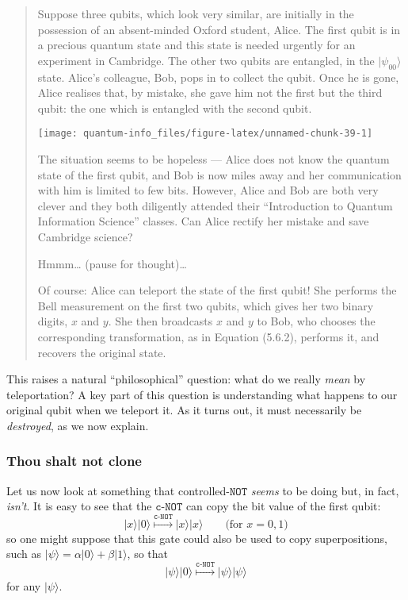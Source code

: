 \documentclass[fleqn]{article}
\begin{document}
\begin{quote}
Suppose three qubits, which look very similar, are initially in the possession of an absent-minded Oxford student, Alice.
The first qubit is in a precious quantum state and this state is needed urgently for an experiment in Cambridge.
The other two qubits are entangled, in the \(|\psi_{00}\rangle\) state. Alice's colleague, Bob, pops in to collect the qubit.
Once he is gone, Alice realises that, by mistake, she gave him not the first but the third qubit: the one which is entangled with the second qubit.

\begin{center}\texttt{[image: quantum-info\_files/figure-latex/unnamed-chunk-39-1]} \end{center}

The situation seems to be hopeless --- Alice does not know the quantum state of the first qubit, and Bob is now miles away and her communication with him is limited to few bits.
However, Alice and Bob are both very clever and they both diligently attended their ``Introduction to Quantum Information Science'' classes.
Can Alice rectify her mistake and save Cambridge science?

Hmmm\ldots{} (pause for thought)\ldots{}

Of course: Alice can teleport the state of the first qubit!
She performs the Bell measurement on the first two qubits, which gives her two binary digits, \(x\) and \(y\).
She then broadcasts \(x\) and \(y\) to Bob, who chooses the corresponding transformation, as in Equation (5.6.2), performs it, and recovers the original state.
\end{quote}

This raises a natural ``philosophical'' question: what do we really \emph{mean} by teleportation?
A key part of this question is understanding what happens to our original qubit when we teleport it.
As it turns out, it must necessarily be \emph{destroyed}, as we now explain.

\hypertarget{thou-shalt-not-clone}{%
\subsubsection{Thou shalt not clone}\label{thou-shalt-not-clone}}

Let us now look at something that controlled-\(\texttt{NOT}\) \emph{seems} to be doing but, in fact, \emph{isn't}.
It is easy to see that the \(\texttt{c-NOT}\) can copy the bit value of the first qubit:
\[
  |x\rangle|0\rangle \overset{\texttt{c-NOT}}{\longmapsto} |x\rangle|x\rangle
  \qquad\text{(for $x=0,1$)}
\]
so one might suppose that this gate could also be used to copy superpositions, such as \(|\psi\rangle = \alpha|0\rangle+\beta|1\rangle\), so that
\[
  |\psi\rangle|0\rangle \overset{\texttt{c-NOT}}{\longmapsto} |\psi\rangle|\psi\rangle
\]
for any \(|\psi\rangle\).
\end{document}
